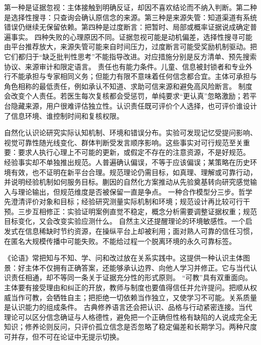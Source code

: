第一种是证据忽视：主体接触到明确反证，却因不喜欢结论而不纳入判断。第二种是选择性搜寻：只查询会确认原信念的来源。第三种是来源失管：知道渠道有系统错误仍继续无保留依赖。第四种是过度断言：把暂时、局部或概率证据说成确定普遍事实。 四种失败的心理原因不同。证据忽视可能是动机偏差，选择性搜寻可能由平台推荐放大，来源失管可能来自时间压力，过度断言可能受奖励机制驱动。把它们都归于“缺乏批判性思考”不能指导改进。对应措施分别是反方清单、预先搜索协议、来源审计和限定语言。 责任也有能力条件。儿童、信息被封锁者和专业外行不能承担与专家相同义务；但能力有限不意味着任何信念都合宜。主体可承担与角色相称的最低责任，例如承认不知道、求助可信来源和避免高风险断言。 制度会改变个人责任。若医生每次复核都会受惩罚，单纯要求“更认真”忽略激励；若平台隐藏来源，用户很难评估独立性。认识责任既可评价个人选择，也可评价谁设计了信息环境、谁控制时间和复核权限。

自然化认识论研究实际认知机制、环境和错误分布。实验可发现记忆受提问影响、视觉可靠性随光线变化、群体判断受发言顺序影响。这些事实对可行规范至关重要：要求人执行心理上不可能的更新，或假定不存在的注意资源，不是好规范。 经验事实却不单独推出规范。人普遍确认偏误，不等于应该偏误；某策略在历史环境有效，也不证明在新平台合理。规范理论仍需目标，如真理、理解或可靠行动，并说明经验机制如何服务目标。蒯因的自然化方案推动从先验奠基转向研究感觉输入与理论输出，但规范维度是否被保留一直是争点\parencite{quine1969}。 一种合作模型分三步。哲学先澄清评价对象和目标；经验研究测量实际机制和环境；规范设计再比较可行干预。三步互相修正：实验证明案例直觉不稳定，概念分析需要调整证据权重；规范目标变化，又会改变实验应测什么。 自然主义还提醒理论的环境敏感性。一个启发式在信息稀缺时节约资源，在操纵平台上却被利用；面对熟人可靠的信任习惯，在匿名大规模传播中可能失败。不能给过程一个脱离环境的永久可靠标签。

《论语》常把知与不知、学、问和改过放在关系实践中\parencite{analects2003}。这提供一种认识主体图景：好主体不仅拥有正确答案，还能够承认边界、向他人学习并修正。它与当代认识责任相通，却不等同一条关于证据充分性的形式原则。 “可教”具有双重面向。主体要有接受理由和纠正的开放，教师与制度也要值得信任并允许提问。把顺从权威当作可教，会牺牲自主；把拒绝一切依赖当作独立，又使学习不可能。关系质量是认识能力的组成条件。 古典修养语言还会把认识、品格与行动紧密连接。当代理论可以区分信念确证与人格德性，避免把一个正确但性格有缺陷的人说成完全无知识；修养论则反问，只评价孤立信念是否忽略了稳定偏差和长期学习。两种尺度可并存，但不可在论证中无提示切换。

